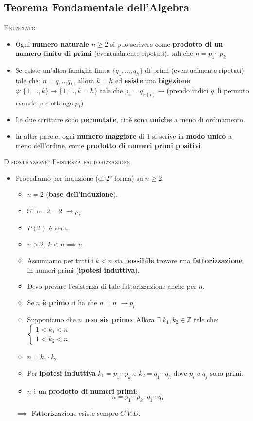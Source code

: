 \documentclass[10pt]{article}
\begin{document}
\subsection{Teorema Fondamentale dell'Algebra}
\textsc{Enunciato:}
\begin{itemize}
\item
Ogni \textbf{numero naturale $n \geq 2$} si può scrivere come \textbf{prodotto di un numero finito di primi} (eventualmente ripetuti), tali che $n = p_1 \dotsb p_k$
\item
Se esiste un'altra famiglia finita $\{q_1, \dotso, q_h\}$ di primi (eventualmente ripetuti) tale che: $n = q_1 \dots q_h$, allora $k = h$ ed \textbf{esiste} una \textbf{bigezione} $\varphi : \{1,\dots, k\} \longrightarrow \{1,\dots, k=h\}$ tale che $p_i = q_{\varphi (i)}$\small{$\rightarrow$(prendo indici $q$, li permuto usando $\varphi$ e ottengo $p_i$)}
\item
Le due scritture sono \textbf{permutate}, cioè sono \textbf{uniche} a meno di ordinamento.
\item
In altre parole, ogni \textbf{numero maggiore} di $1$ si scrive in \textbf{modo unico} a meno dell'ordine, come \textbf{prodotto di numeri primi positivi}.
\end{itemize}
\textsc{Dimostrazione: Esistenza fattorizzazione}
\begin{itemize}
\item
Procediamo per induzione (di 2° forma) su $n \geq 2$:
\begin{itemize}
\item
$n=2$ (\textbf{base dell'induzione}).
\item
Si ha: $2=2$ \small{$\rightarrow p_i$}
\item
$P(2)$ è vera.
\item
$n > 2,\, k<n \implies n$
\item
Assumiamo per tutti i $k<n$ sia \textbf{possibile} trovare una \textbf{fattorizzazione} in numeri primi (\textbf{ipotesi induttiva}).
\item
Devo provare l'esistenza di tale fattorizzazione anche per $n$.
\item
Se $n$ \textbf{è primo} si ha che $n = n$ \small{$\rightarrow p_i$}
\item
Supponiamo che \textbf{$n$ non sia primo}. Allora $\exists \,\, k_1, k_2 \in \mathbb{Z}$ tale che:$\begin{cases} 1 < k_1 < n \\ 1 < k_2 < n \end{cases}$
\item
$n = k_1 \cdot k_2$
\item
Per \textbf{ipotesi induttiva} $k_1 = p_1 \dotsb p_k$ e $k_2 = q_1 \dotsb q_h$ dove $p_i$ e $q_j$ sono primi.
\item
$n$ è un \textbf{prodotto di numeri primi}: $$n = p_1 \dotsb p_k \cdot q_1 \dotsb q_h$$
\end{itemize}
$\implies$ Fattorizzazione esiste sempre $C.V.D.$
\end{itemize}
\end{document}
